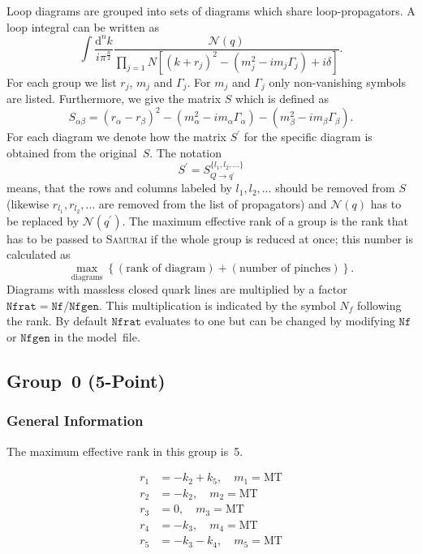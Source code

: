 \documentclass[a4paper]{article}
\begin{document}
Loop diagrams are grouped into sets of diagrams which share
loop-propagators. A loop integral can be written as
\begin{equation}
\int\!\frac{\mathrm{d}^nk}{i\pi^{\frac{n}{2}}}%
\frac{\mathcal{N}(q)}{\prod_{j=1}{N}\left[(k+r_j)^2-(m_j^2
   -i m_j\Gamma_j) + i\delta\right]}.
\end{equation}
For each group we list $r_j$, $m_j$ and $\Gamma_j$.
For $m_j$ and $\Gamma_j$ only non-vanishing symbols are listed.
Furthermore, we give the matrix $S$ which is defined as
\begin{equation}
S_{\alpha\beta} = (r_\alpha-r_\beta)^2
-(m_\alpha^2-im_\alpha\Gamma_\alpha)
-(m_\beta^2-im_\beta\Gamma_\beta).
\end{equation}
For each diagram we denote how the matrix $S^\prime$ for the specific diagram
is obtained from the original~$S$. The notation
\begin{equation}
S^\prime=S_{Q\to q^\prime}^{\{l_1,l_2,\ldots\}}
\end{equation}
means, that the rows and columns labeled by $l_1,l_2,\ldots$ should be
removed from $S$ (likewise $r_{l_1}, r_{l_2}, \ldots$ are removed from the
list of propagators) and $\mathcal{N}(q)$ has to be replaced by
$\mathcal{N}(q^\prime)$.
The maximum effective rank of a group is the rank that has to be passed
to \textsc{Samurai} if the whole group is reduced at once; this number
is calculated as
\begin{equation}
\max_{\text{diagrams}}\left\{(\text{rank of diagram})+
(\text{number of pinches})\right\}.
\end{equation}
Diagrams with massless closed quark lines are multiplied by a factor
$\mathtt{Nfrat}=\mathtt{Nf}/\mathtt{Nfgen}$. This multiplication is indicated
by the symbol $N_f$ following the rank. By default $\mathtt{Nfrat}$ evaluates
to one but can be changed by modifying $\mathtt{Nf}$ or $\mathtt{Nfgen}$ in the
model~file.


\subsection{Group~0 (5-Point)}
\subsubsection*{General Information}
The maximum effective rank in this group is~5.

\begin{subequations}
\begin{align}
r_{1} &= -k_{2}+k_{5},\quad m_{1} = \text{MT}\\
r_{2} &= -k_{2},\quad m_{2} = \text{MT}\\
r_{3} &= 0,\quad m_{3} = \text{MT}\\
r_{4} &= -k_{3},\quad m_{4} = \text{MT}\\
r_{5} &= -k_{3}-k_{4},\quad m_{5} = \text{MT}
\end{align}
\end{subequations}
\end{document}
